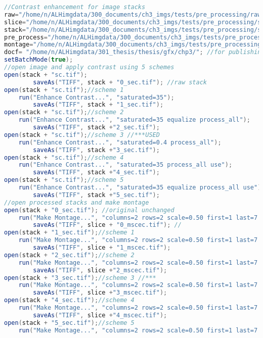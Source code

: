 \begin{lstlisting}[language=java, caption=Stack pre-processing examples.,  label=cd:pre-process-stacks]
//Contrast enhancement for image stacks
raw="/home/n/ALHimgdata/300_documents/ch3_imgs/tests/pre_processing/raw/"; //source and output dir
slice="/home/n/ALHimgdata/300_documents/ch3_imgs/tests/pre_processing/slice/"; 
stack="/home/n/ALHimgdata/300_documents/ch3_imgs/tests/pre_processing/stack/";
pre_process="/home/n/ALHimgdata/300_documents/ch3_imgs/tests/pre_processing/pre_process/";
montage="/home/n/ALHimgdata/300_documents/ch3_imgs/tests/pre_processing/montage/";
docf= "/home/n/ALHimgdata/301_thesis/thesis/gfx/chp3/"; //for publishing images
setBatchMode(true);
//open image and apply contrast using 5 schemes
open(stack + "sc.tif");	
		saveAs("TIFF", stack + "0_sec.tif"); //raw stack
open(stack + "sc.tif");//scheme 1
	run("Enhance Contrast...", "saturated=35");
		saveAs("TIFF", stack + "1_sec.tif"); 
open(stack + "sc.tif");//scheme 2
	run("Enhance Contrast...", "saturated=35 equalize process_all");
		saveAs("TIFF", stack +"2_sec.tif");
open(stack + "sc.tif");//scheme 3 //***USED
	run("Enhance Contrast...", "saturated=0.4 process_all");
		saveAs("TIFF", stack +"3_sec.tif");
open(stack + "sc.tif");//scheme 4
	run("Enhance Contrast...", "saturated=35 process_all use");
		saveAs("TIFF", stack +"4_sec.tif");
open(stack + "sc.tif");//scheme 5
	run("Enhance Contrast...", "saturated=35 equalize process_all use");
		saveAs("TIFF", stack +"5_sec.tif");
//open processed stacks and make montage
open(stack + "0_sec.tif"); //original unchanged
	run("Make Montage...", "columns=2 rows=2 scale=0.50 first=1 last=7 increment=2 border=4 font=20 label use"); 
		saveAs("TIFF", slice + "0_mscec.tif"); //
open(stack + "1_sec.tif");//scheme 1
	run("Make Montage...", "columns=2 rows=2 scale=0.50 first=1 last=7 increment=2 border=4 font=20 label use"); 
		saveAs("TIFF", slice + "1_mscec.tif"); 
open(stack + "2_sec.tif");//scheme 2
	run("Make Montage...", "columns=2 rows=2 scale=0.50 first=1 last=7 increment=2 border=4 font=20 label use"); 
		saveAs("TIFF", slice +"2_mscec.tif");
open(stack + "3_sec.tif");//scheme 3 //***
	run("Make Montage...", "columns=2 rows=2 scale=0.50 first=1 last=7 increment=2 border=4 font=20 label use"); 
		saveAs("TIFF", slice +"3_mscec.tif");
open(stack + "4_sec.tif");//scheme 4
	run("Make Montage...", "columns=2 rows=2 scale=0.50 first=1 last=7 increment=2 border=4 font=20 label use"); 
		saveAs("TIFF", slice +"4_mscec.tif");
open(stack + "5_sec.tif");//scheme 5
	run("Make Montage...", "columns=2 rows=2 scale=0.50 first=1 last=7 increment=2 border=4 font=20 label"); 

\end{lstlisting}
